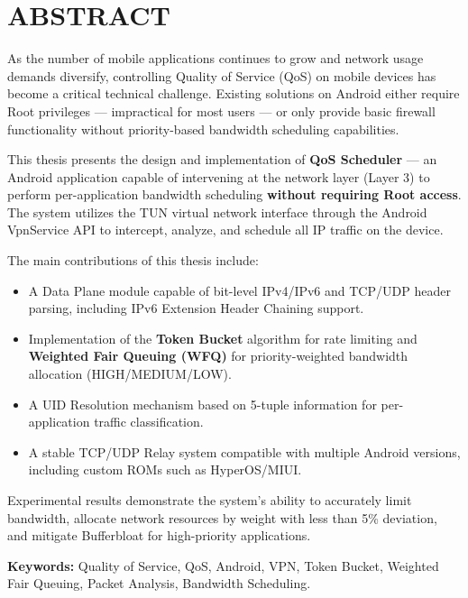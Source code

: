 
\chapter*{ABSTRACT}

As the number of mobile applications continues to grow and network usage demands diversify, controlling Quality of Service (QoS) on mobile devices has become a critical technical challenge. Existing solutions on Android either require Root privileges --- impractical for most users --- or only provide basic firewall functionality without priority-based bandwidth scheduling capabilities.

This thesis presents the design and implementation of \textbf{QoS Scheduler} --- an Android application capable of intervening at the network layer (Layer 3) to perform per-application bandwidth scheduling \textbf{without requiring Root access}. The system utilizes the TUN virtual network interface through the Android VpnService API to intercept, analyze, and schedule all IP traffic on the device.

The main contributions of this thesis include:
\begin{itemize}
    \item A Data Plane module capable of bit-level IPv4/IPv6 and TCP/UDP header parsing, including IPv6 Extension Header Chaining support.
    \item Implementation of the \textbf{Token Bucket} algorithm for rate limiting and \textbf{Weighted Fair Queuing (WFQ)} for priority-weighted bandwidth allocation (HIGH/MEDIUM/LOW).
    \item A UID Resolution mechanism based on 5-tuple information for per-application traffic classification.
    \item A stable TCP/UDP Relay system compatible with multiple Android versions, including custom ROMs such as HyperOS/MIUI.
\end{itemize}

Experimental results demonstrate the system's ability to accurately limit bandwidth, allocate network resources by weight with less than 5\% deviation, and mitigate Bufferbloat for high-priority applications.

\vspace{1cm}
\noindent\textbf{Keywords:} Quality of Service, QoS, Android, VPN, Token Bucket, Weighted Fair Queuing, Packet Analysis, Bandwidth Scheduling.
